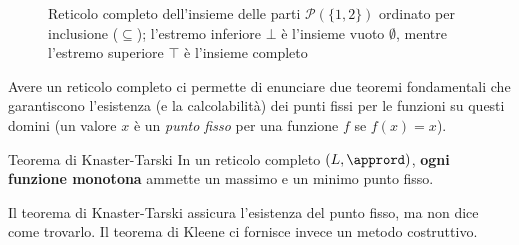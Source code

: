 \begin{figure}[htbp]
    \centering
    \caption{Reticolo completo dell'insieme delle parti $\mathcal{P}(\{1,2\})$ ordinato per inclusione ($\subseteq$); l'estremo inferiore $\bot$ è l'insieme vuoto $\emptyset$, mentre l'estremo superiore $\top$ è l'insieme completo}
\end{figure}

Avere un reticolo completo ci permette di enunciare due teoremi fondamentali che garantiscono l'esistenza (e la calcolabilità) dei punti fissi per le funzioni su questi domini (un valore $x$ è un \textit{punto fisso} per una funzione $f$ se $f(x) = x$).

\begin{defframe}{Teorema di Knaster-Tarski}{}
    In un reticolo completo $(L, \apprord)$, \textbf{ogni funzione monotona} ammette un massimo e un minimo punto fisso.
\end{defframe}

Il teorema di Knaster-Tarski assicura l'esistenza del punto fisso, ma non dice come trovarlo. Il teorema di Kleene ci fornisce invece un metodo costruttivo.


